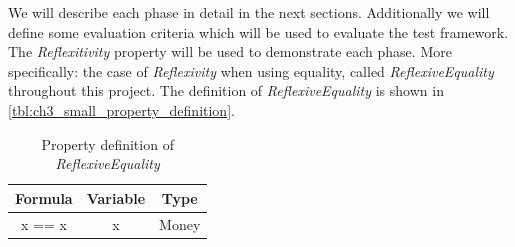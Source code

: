 We will describe each phase in detail in the next sections. Additionally we will define some evaluation criteria which will be used to evaluate the test framework. The \textit{Reflexitivity} property will be used to demonstrate each phase. More specifically: the case of \textit{Reflexivity} when using equality, called \textit{ReflexiveEquality} throughout this project. The definition of \textit{ReflexiveEquality} is shown in \autoref{tbl:ch3_small_property_definition}.
\FloatBarrier
\begin{table}[!ht]
\centering
\begin{tabular}{ccc}
\hline
\textbf{Formula} & \textbf{Variable} & \textbf{Type} \\ \hline
x == x & x & Money \\ \hline
\end{tabular}
\caption{Property definition of \textit{ReflexiveEquality}}
\label{tbl:ch3_small_property_definition}
\end{table}
\FloatBarrier

